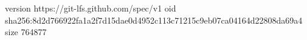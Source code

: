 version https://git-lfs.github.com/spec/v1
oid sha256:8d2d766922fa1a2f7d15dae0d4952c113c71215c9eb07ca04164d22808da69a4
size 764877
